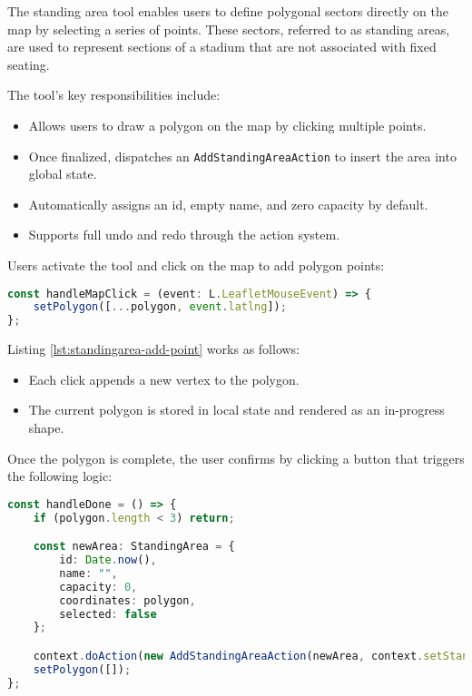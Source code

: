 The standing area tool enables users to define polygonal sectors directly on the map by selecting a series of points. These sectors, referred to as standing areas, are used to represent sections of a stadium that are not associated with fixed seating.

The tool’s key responsibilities include:
\begin{itemize}
    \item Allows users to draw a polygon on the map by clicking multiple points.
    \item Once finalized, dispatches an \texttt{AddStandingAreaAction} to insert the area into global state.
    \item Automatically assigns an id, empty name, and zero capacity by default.
    \item Supports full undo and redo through the action system.
\end{itemize}

Users activate the tool and click on the map to add polygon points:

\begin{lstlisting}[language=TypeScript, caption=Adding Polygon Points, label=lst:standingarea-add-point]
const handleMapClick = (event: L.LeafletMouseEvent) => {
    setPolygon([...polygon, event.latlng]);
};
\end{lstlisting}

Listing \ref{lst:standingarea-add-point} works as follows:
\begin{itemize}
    \item Each click appends a new vertex to the polygon.
    \item The current polygon is stored in local state and rendered as an in-progress shape.
\end{itemize}

Once the polygon is complete, the user confirms by clicking a button that triggers the following logic:

\begin{lstlisting}[language=TypeScript, caption=Finalizing Standing Area, label=lst:standingarea-finalize]
const handleDone = () => {
    if (polygon.length < 3) return;

    const newArea: StandingArea = {
        id: Date.now(),
        name: "",
        capacity: 0,
        coordinates: polygon,
        selected: false
    };

    context.doAction(new AddStandingAreaAction(newArea, context.setStandingAreas));
    setPolygon([]);
};
\end{lstlisting}

